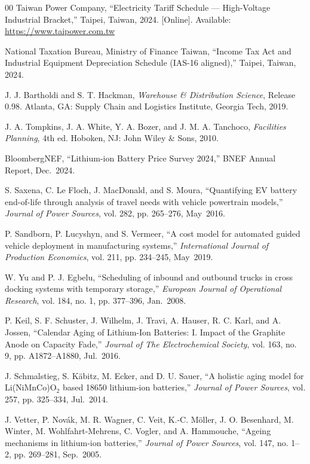 \documentclass[conference]{IEEEtran}
\begin{document}
\begin{thebibliography}{00}
Taiwan Power Company, ``Electricity Tariff Schedule --- High-Voltage Industrial Bracket,'' Taipei, Taiwan, 2024. [Online]. Available: \url{https://www.taipower.com.tw}

National Taxation Bureau, Ministry of Finance Taiwan, ``Income Tax Act and Industrial Equipment Depreciation Schedule (IAS-16 aligned),'' Taipei, Taiwan, 2024.

J. J. Bartholdi and S. T. Hackman, \emph{Warehouse \& Distribution Science}, Release 0.98. Atlanta, GA: Supply Chain and Logistics Institute, Georgia Tech, 2019.

J. A. Tompkins, J. A. White, Y. A. Bozer, and J. M. A. Tanchoco, \emph{Facilities Planning}, 4th ed. Hoboken, NJ: John Wiley \& Sons, 2010.

BloombergNEF, ``Lithium-ion Battery Price Survey 2024,'' BNEF Annual Report, Dec.~2024.

S. Saxena, C. Le Floch, J. MacDonald, and S. Moura, ``Quantifying EV battery end-of-life through analysis of travel needs with vehicle powertrain models,'' \emph{Journal of Power Sources}, vol. 282, pp. 265--276, May~2016.

P. Sandborn, P. Lucyshyn, and S. Vermeer, ``A cost model for automated guided vehicle deployment in manufacturing systems,'' \emph{International Journal of Production Economics}, vol. 211, pp. 234--245, May~2019.

W. Yu and P. J. Egbelu, ``Scheduling of inbound and outbound trucks in cross docking systems with temporary storage,'' \emph{European Journal of Operational Research}, vol. 184, no. 1, pp. 377--396, Jan.~2008.

P. Keil, S. F. Schuster, J. Wilhelm, J. Travi, A. Hauser, R. C. Karl, and A. Jossen, ``Calendar Aging of Lithium-Ion Batteries: I. Impact of the Graphite Anode on Capacity Fade,'' \emph{Journal of The Electrochemical Society}, vol. 163, no. 9, pp. A1872--A1880, Jul.~2016.

J. Schmalstieg, S. K\"abitz, M. Ecker, and D. U. Sauer, ``A holistic aging model for Li(NiMnCo)O$_2$ based 18650 lithium-ion batteries,'' \emph{Journal of Power Sources}, vol. 257, pp. 325--334, Jul.~2014.

J. Vetter, P. Nov\'ak, M. R. Wagner, C. Veit, K.-C. M\"oller, J. O. Besenhard, M. Winter, M. Wohlfahrt-Mehrens, C. Vogler, and A. Hammouche, ``Ageing mechanisms in lithium-ion batteries,'' \emph{Journal of Power Sources}, vol. 147, no. 1--2, pp. 269--281, Sep.~2005.

\end{thebibliography}
\end{document}
